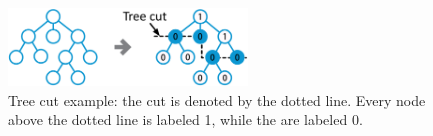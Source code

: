 \begin{figure}[t]
  \centering
  \includegraphics[width=2.5in]{fig/treecut}
  \caption{
Tree cut example: the cut is denoted by the dotted line. Every node above the dotted line is labeled 1, while the  are labeled 0.
}
  \label{fig:treecutexample}
  \vspace{-5mm}
\end{figure}



